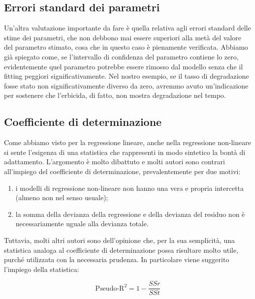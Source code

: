 \documentclass[a4paper,12pt,oneside]{book}
\providecommand{\tightlist}{%
  \setlength{\itemsep}{0pt}\setlength{\parskip}{0pt}}
\begin{document}
\hypertarget{errori-standard-dei-parametri-1}{%
\subsection{Errori standard dei parametri}\label{errori-standard-dei-parametri-1}}

Un'altra valutazione importante da fare è quella relativa agli errori standard delle stime dei parametri, che non debbono mai essere superiori alla metà del valore del parametro stimato, cosa che in questo caso è pienamente verificata. Abbiamo già spiegato come, se l'intervallo di confidenza del parametro contiene lo zero, evidentemente quel parametro potrebbe essere rimosso dal modello senza che il fitting peggiori significativamente. Nel nostro esempio, se il tasso di degradazione fosse stato non significativamente diverso da zero, avremmo avuto un'indicazione per sostenere che l'erbicida, di fatto, non mostra degradazione nel tempo.

\hypertarget{coefficiente-di-determinazione-1}{%
\subsection{Coefficiente di determinazione}\label{coefficiente-di-determinazione-1}}

Come abbiamo visto per la regressione lineare, anche nella regressione non-lineare si sente l'esigenza di una statistica che rappresenti in modo sintetico la bontà di adattamento. L'argomento è molto dibattuto e molti autori sono contrari all'impiego del coefficiente di determinazione, prevalentemente per due motivi:

\begin{enumerate}
\def\labelenumi{\arabic{enumi}.}
\tightlist
\item
  i modelli di regressione non-lineare non hanno una vera e propria intercetta (almeno non nel senso usuale);
\item
  la somma della devianza della regressione e della devianza del residuo non è necessariamente uguale alla devianza totale.
\end{enumerate}

Tuttavia, molti altri autori sono dell'opinione che, per la sua semplicità, una statistica analoga al coefficiente di determinazione possa risultare molto utile, purché utilizzata con la necessaria prudenza. In particolare viene suggerito l'impiego della statistica:

\[\textrm{Pseudo-R}^2 = 1 - \frac{SSr}{SSt}\]
\end{document}
